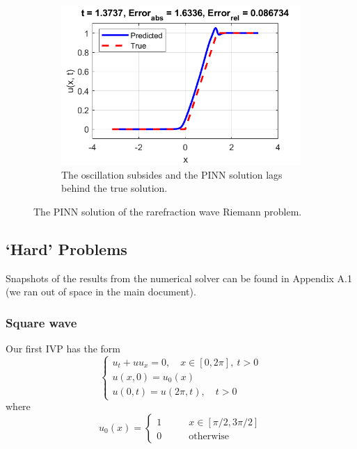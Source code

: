 \documentclass{myproject}
\begin{document}
\begin{figure}
\begin{subfigure}{.48\textwidth}
        \includegraphics[width=1\textwidth]{t137_NN_rarefraction.png}
        \caption{The oscillation subsides and the PINN solution lags behind the true solution.}
    \end{subfigure}
    \caption{The PINN solution of the rarefraction wave Riemann problem.}
\end{figure}

\subsection{`Hard' Problems}
Snapshots of the results from the numerical solver can be found in Appendix A.1 (we ran out of space in the main document).
\subsubsection{Square wave}

Our first IVP has the form
\begin{equation}\label{square_wave}
    \begin{cases}
        u_t + uu_x = 0, \quad x \in [0, 2\pi], \: t>0 \\
        u(x,0) = u_0(x) \\
        u(0,t) = u(2\pi,t), \quad t > 0
    \end{cases}
\end{equation}
where
\begin{equation}
    u_0(x) = 
    \begin{cases}
        1 \qquad &  x \in [\pi/2, 3\pi/2] \\
        0 \qquad & \text{otherwise} 
    \end{cases}
\end{equation}
\end{document}

